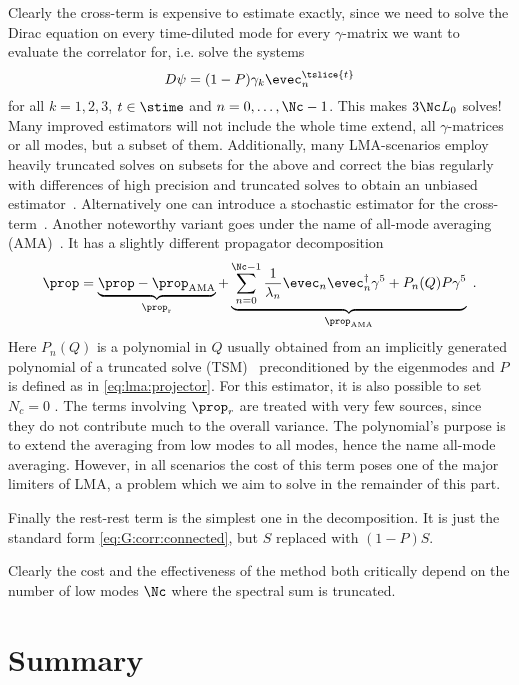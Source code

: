 Clearly the cross-term is expensive to estimate exactly, since we need to solve the Dirac equation on every time-diluted mode for every $\gamma$-matrix we want to evaluate the correlator for, i.e. solve the systems
\begin{equation}
D \psi = (1-P) \gamma_k \evec_{n}^{\tslice{t}}
\end{equation}
for all $k = 1,2,3$, $t \in \stime$ and $n = 0, \ldots, \Nc-1$.
This makes $3 \Nc L_0$ solves!
Many improved estimators will not include the whole time extend, all $\gamma$-matrices or all modes, but a subset of them.
Additionally, many LMA-scenarios employ heavily truncated solves on subsets for the above and correct the bias regularly with differences of high precision and truncated solves to obtain an unbiased estimator~\cite{bmw_2017,Kuberski_2023}.
Alternatively one can introduce a stochastic estimator for the cross-term~\cite{lynch2023,fermi_2023}.
Another noteworthy variant goes under the name of all-mode averaging (AMA)~\cite{Blum_2012,Blum_2015,CAA,RBC_2018}.
It has a slightly different propagator decomposition
\begin{equation}
\prop
= \underbrace{\prop - \prop_{\text{AMA}}}_{\prop_{\text{r}}}
+ \underbrace{\sum_{n=0}^{\Nc-1} \frac{1}{\lambda_n} \evec_n \evec_n^{\dagger} \gamma^{5}
+ P_n(Q) P \gamma^{5}}_{\prop_{\text{AMA}}}\;.
\end{equation}
Here $P_n(Q)$ is a polynomial in $Q$ usually obtained from an implicitly generated polynomial of a truncated solve (TSM)~\cite{Bali_2009} preconditioned by the eigenmodes and $P$ is defined as in \cref{eq:lma:projector}.
For this estimator, it is also possible to set $N_c=0$ \cite{Blum_2012}.
The terms involving $\prop_{r}$ are treated with very few sources, since they do not contribute much to the overall variance.
The polynomial's purpose is to extend the averaging from low modes to all modes, hence the name all-mode averaging.
However, in all scenarios the cost of this term poses one of the major limiters of LMA, a problem which we aim to solve in the remainder of this part.

Finally the rest-rest term is the simplest one in the decomposition.
It is just the standard form \cref{eq:G:corr:connected}, but $S$ replaced with $(1-P)S$.

Clearly the cost and the effectiveness of the method both critically depend on the number of low modes $\Nc$ where the spectral sum is truncated.


\section{Summary}
\label{sec:2pt:summary}

